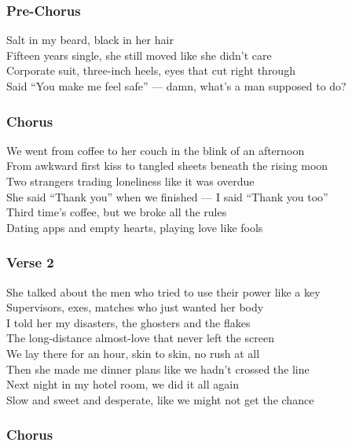 \subsubsection{Pre-Chorus}\label{pre-chorus-69}

Salt in my beard, black in her hair\\
Fifteen years single, she still moved like she didn't care\\
Corporate suit, three-inch heels, eyes that cut right through\\
Said ``You make me feel safe'' --- damn, what's a man supposed to do?

\subsubsection{Chorus}\label{chorus-87}

We went from coffee to her couch in the blink of an afternoon\\
From awkward first kiss to tangled sheets beneath the rising moon\\
Two strangers trading loneliness like it was overdue\\
She said ``Thank you'' when we finished --- I said ``Thank you too''\\
Third time's coffee, but we broke all the rules\\
Dating apps and empty hearts, playing love like fools

\subsubsection{Verse 2}\label{verse-2-34}

She talked about the men who tried to use their power like a key\\
Supervisors, exes, matches who just wanted her body\\
I told her my disasters, the ghosters and the flakes\\
The long-distance almost-love that never left the screen\\
We lay there for an hour, skin to skin, no rush at all\\
Then she made me dinner plans like we hadn't crossed the line\\
Next night in my hotel room, we did it all again\\
Slow and sweet and desperate, like we might not get the chance

\subsubsection{Chorus}\label{chorus-88}

